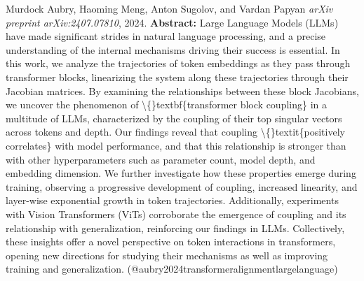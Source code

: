 \documentclass{article} %
\begin{document}
\begin{thebibliography}{}
 Murdock Aubry, Haoming Meng, Anton Sugolov, and Vardan Papyan  \newblock \emph{arXiv preprint arXiv:2407.07810}, 2024. \newblock \textbf{Abstract:} Large Language Models (LLMs) have made significant strides in natural language processing, and a precise understanding of the internal mechanisms driving their success is essential. In this work, we analyze the trajectories of token embeddings as they pass through transformer blocks, linearizing the system along these trajectories through their Jacobian matrices. By examining the relationships between these block Jacobians, we uncover the phenomenon of \textbackslash\{\}textbf\{transformer block coupling\} in a multitude of LLMs, characterized by the coupling of their top singular vectors across tokens and depth. Our findings reveal that coupling \textbackslash\{\}textit\{positively correlates\} with model performance, and that this relationship is stronger than with other hyperparameters such as parameter count, model depth, and embedding dimension. We further investigate how these properties emerge during training, observing a progressive development of coupling, increased linearity, and layer-wise exponential growth in token trajectories. Additionally, experiments with Vision Transformers (ViTs) corroborate the emergence of coupling and its relationship with generalization, reinforcing our findings in LLMs. Collectively, these insights offer a novel perspective on token interactions in transformers, opening new directions for studying their mechanisms as well as improving training and generalization. \newblock (@aubry2024transformeralignmentlargelanguage)


\end{thebibliography}
\end{document}
